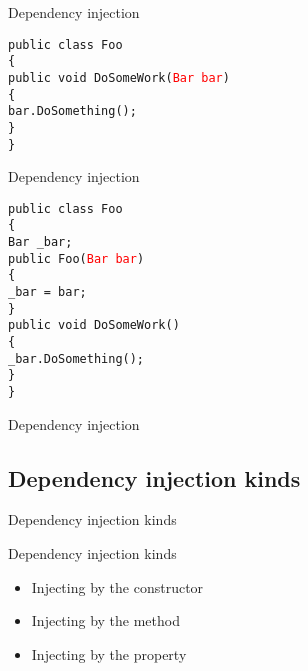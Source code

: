 \documentclass{beamer}
\newcommand{\code}[1]{{\texttt{#1}}}
\begin{document}
\begin{frame}{Dependency injection}
     \begin{large}
	\code{public class Foo}\\
	\code{\{}\\ \quad
		\code{public void DoSomeWork(\textcolor{red}{Bar bar})}\\ \quad
		\code{\{}\\ \qquad
		\code{bar.DoSomething();}\\ \quad
		\code{\}}\\
	\code{\}}
     \end{large}
\end{frame}

\begin{frame}{Dependency injection}
     \begin{large}
	\code{public class Foo}\\
	\code{\{}\\ \quad
		\code{Bar \_bar;}\\ \quad
		\code{public Foo(\textcolor{red}{Bar bar})}\\ \quad
		\code{\{}\\ \qquad
		\code{\_bar = bar;}\\ \quad
		\code{\}}\\ \quad
		\code{public void DoSomeWork()}\\ \quad
		\code{\{}\\ \qquad
		\code{\_bar.DoSomething();}\\ \quad
		\code{\}}\\
	\code{\}}
     \end{large}
\end{frame}

\begin{frame}{}
	\begin{center}
		\Large{Dependency injection}
	\end{center}
\end{frame}

\subsection*{Dependency injection kinds}

\begin{frame}{}
	\begin{center}
		\Large{Dependency injection kinds}
	\end{center}
\end{frame}

\begin{frame}{Dependency injection kinds}
     \begin{Large}
	\begin{itemize}
		\item Injecting by the constructor
		\item Injecting by the method
		\item Injecting by the property
	\end{itemize}
     \end{Large}
\end{frame}
\end{document}
